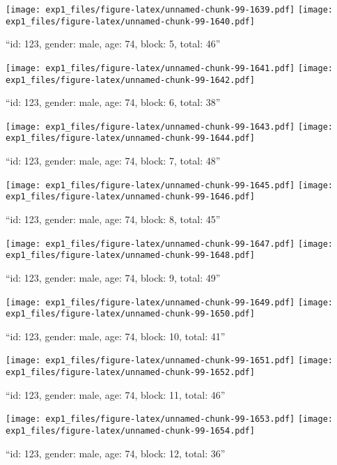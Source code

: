\documentclass[,]{article}
\begin{document}
\texttt{[image: exp1\_files/figure-latex/unnamed-chunk-99-1639.pdf]}
\texttt{[image: exp1\_files/figure-latex/unnamed-chunk-99-1640.pdf]}

\newpage
[1] 

``id: 123, gender: male, age: 74, block: 5, total: 46''

\texttt{[image: exp1\_files/figure-latex/unnamed-chunk-99-1641.pdf]}
\texttt{[image: exp1\_files/figure-latex/unnamed-chunk-99-1642.pdf]}

\newpage
[1] 

``id: 123, gender: male, age: 74, block: 6, total: 38''

\texttt{[image: exp1\_files/figure-latex/unnamed-chunk-99-1643.pdf]}
\texttt{[image: exp1\_files/figure-latex/unnamed-chunk-99-1644.pdf]}

\newpage
[1] 

``id: 123, gender: male, age: 74, block: 7, total: 48''

\texttt{[image: exp1\_files/figure-latex/unnamed-chunk-99-1645.pdf]}
\texttt{[image: exp1\_files/figure-latex/unnamed-chunk-99-1646.pdf]}

\newpage
[1] 

``id: 123, gender: male, age: 74, block: 8, total: 45''

\texttt{[image: exp1\_files/figure-latex/unnamed-chunk-99-1647.pdf]}
\texttt{[image: exp1\_files/figure-latex/unnamed-chunk-99-1648.pdf]}

\newpage
[1] 

``id: 123, gender: male, age: 74, block: 9, total: 49''

\texttt{[image: exp1\_files/figure-latex/unnamed-chunk-99-1649.pdf]}
\texttt{[image: exp1\_files/figure-latex/unnamed-chunk-99-1650.pdf]}

\newpage
[1] 

``id: 123, gender: male, age: 74, block: 10, total: 41''

\texttt{[image: exp1\_files/figure-latex/unnamed-chunk-99-1651.pdf]}
\texttt{[image: exp1\_files/figure-latex/unnamed-chunk-99-1652.pdf]}

\newpage
[1] 

``id: 123, gender: male, age: 74, block: 11, total: 46''

\texttt{[image: exp1\_files/figure-latex/unnamed-chunk-99-1653.pdf]}
\texttt{[image: exp1\_files/figure-latex/unnamed-chunk-99-1654.pdf]}

\newpage
[1] 

``id: 123, gender: male, age: 74, block: 12, total: 36''
\end{document}
